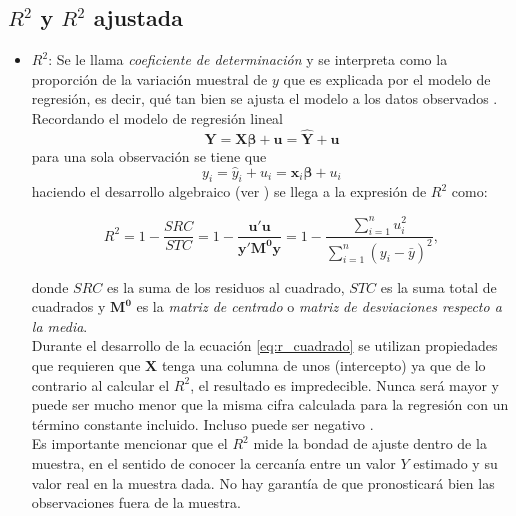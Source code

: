 \documentclass[12pt]{article}
\begin{document}




\subsection*{$R^2$ y $R^2$ ajustada}
\begin{itemize}
    \item $R^2$: Se le llama \textit{coeficiente de determinación} y se interpreta como la proporción de la variación muestral
    de $y$ que es explicada por el modelo de regresión, es decir, qué tan bien se ajusta el modelo a los datos observados \cite{wooldridge_introductory_2009}.\\
    Recordando el modelo de regresión lineal 
    \begin{equation}
        \pmb{Y = X\beta + u = \hat{Y} + u}
        \label{eq:modelo_regresion}
    \end{equation}
    para una sola observación se tiene que 
    \begin{equation}
        y_i = \hat{y}_i + u_i = \pmb{x}_i \pmb{\beta} + u_i
        \label{eq:modelo_regresion_i}
    \end{equation}
    haciendo el desarrollo algebraico (ver \cite{greene_econometric_2012}) se llega a la expresión de $R^2$ como:
    
    \begin{equation}
        R^2 = 1 - \frac{SRC}{STC} = 1 - \frac{\pmb{u'u}}{\pmb{y'M^0y}} = 
        1 - \frac{\sum_{i=1}^{n} u_i^2}{\sum_{i=1}^{n} (y_i - \bar{y})^2},
        \label{eq:r_cuadrado}
    \end{equation}

    donde $SRC$ es la suma de los residuos al cuadrado, $STC$ es la suma total de cuadrados y
    $\pmb{M^0}$ es la \textit{matriz de centrado} o \textit{matriz de desviaciones respecto a la media}.\\
    Durante el desarrollo de la ecuación \eqref{eq:r_cuadrado} se utilizan propiedades que requieren
    que $\pmb{X}$ tenga una columna de unos (intercepto) ya que de lo contrario al calcular el $R^2$, el 
    resultado es impredecible. Nunca será mayor y puede ser mucho menor que la misma cifra calculada para 
    la regresión con un término constante incluido. Incluso puede ser negativo \cite{greene_econometric_2012}.\\
    Es importante mencionar que el $R^2$ mide la bondad de ajuste dentro de la muestra, en el sentido de conocer 
    la cercanía entre un valor $Y$ estimado y su valor real en la muestra dada. No hay garantía de que pronosticará 
    bien las observaciones fuera de la muestra.
    

\end{itemize}
\end{document}
